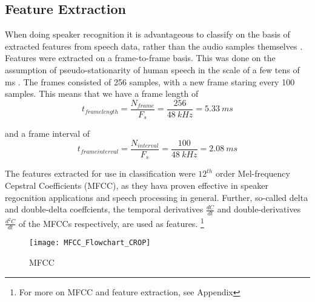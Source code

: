 \subsection*{Feature Extraction}
When doing speaker recognition it is advantageous to classify on the basis of extracted features from speech data, rather than the audio samples themselves \cite{Springer:36}.
Features were extracted on a frame-to-frame basis.
This was done on the assumption of pseudo-stationarity of human speech in the scale of a few tens of ms \cite{Springer:36}.
The frames consisted of 256 samples, with a new frame staring every 100 samples.
This means that we have a frame length of
\begin{equation}
t_{frame length} = \dfrac{N_{frame}}{F_s} = \dfrac{256}{48\ kHz} = 5.33\ ms
\end{equation}

and a frame interval of
\begin{equation}
t_{frame interval} = \dfrac{N_{interval}}{F_s} = \dfrac{100}{48\ kHz} = 2.08\ ms
\end{equation}

The features extracted for use in classification were $12^{th}$ order Mel-frequency Cepstral Coefficients (MFCC), as they hava proven effective in speaker regocnition applications and speech processing in general.
Further, so-called delta and double-delta coeffcients, the temporal derivatives $ \frac{dC}{dt} $ and double-derivatives $\frac{d^2C}{dt}$ of the MFCCs respectively, are used as features.
\footnote{For more on MFCC and feature extraction, see Appendix} 

\begin{figure}[H]
\centering
\texttt{[image: MFCC\_Flowchart\_CROP]}
\caption{MFCC}
\label{fig:MFCC_Flowchart}
\end{figure}
